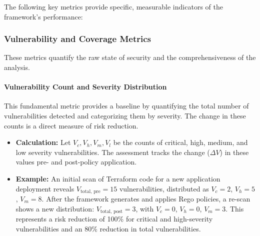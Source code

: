 The following key metrics provide specific, measurable indicators of the framework's performance:

\subsubsection*{Vulnerability and Coverage Metrics}
These metrics quantify the raw state of security and the comprehensiveness of the analysis.

\paragraph{Vulnerability Count and Severity Distribution} This fundamental metric provides a baseline by quantifying the total number of vulnerabilities detected and categorizing them by severity. The change in these counts is a direct measure of risk reduction.
\begin{itemize}
    \item \textbf{Calculation:} Let \( V_c, V_h, V_m, V_l \) be the counts of critical, high, medium, and low severity vulnerabilities. The assessment tracks the change (\( \Delta V \)) in these values pre- and post-policy application.
    \item \textbf{Example:} An initial scan of Terraform code for a new application deployment reveals \( V_{\text{total, pre}} = 15 \) vulnerabilities, distributed as \( V_c = 2 \), \( V_h = 5 \), \( V_m = 8 \). After the framework generates and applies Rego policies, a re-scan shows a new distribution: \( V_{\text{total, post}} = 3 \), with \( V_c = 0 \), \( V_h = 0 \), \( V_m = 3 \). This represents a risk reduction of 100\% for critical and high-severity vulnerabilities and an 80\% reduction in total vulnerabilities.
\end{itemize}

